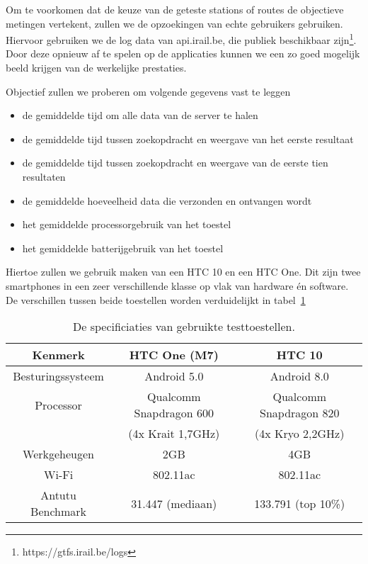Om te voorkomen dat de keuze van de geteste stations of routes de objectieve metingen vertekent, zullen we de opzoekingen van echte gebruikers gebruiken. Hiervoor gebruiken we de log data van api.irail.be, die publiek beschikbaar zijn\footnote{https://gtfs.irail.be/logs}. Door deze  opnieuw af te spelen op de applicaties kunnen we een zo goed mogelijk beeld krijgen van de werkelijke prestaties.

Objectief zullen we proberen om volgende gegevens vast te leggen
\begin{itemize}
	\item de gemiddelde tijd om alle data van de server te halen
	\item de gemiddelde tijd tussen zoekopdracht en weergave van het eerste resultaat
	\item de gemiddelde tijd tussen zoekopdracht en weergave van de eerste tien resultaten
	\item de gemiddelde hoeveelheid data die verzonden en ontvangen wordt
	\item het gemiddelde processorgebruik van het toestel
	\item het gemiddelde batterijgebruik van het toestel
\end{itemize}

Hiertoe zullen we gebruik maken van een HTC 10 en een HTC One. Dit zijn twee smartphones in een zeer verschillende klasse op vlak van hardware én software. De verschillen tussen beide toestellen worden verduidelijkt in tabel~\ref{tab:testdevices}
\begin{table}[ht]
	\begin{tabular}{| c | c | c |}
		\hline
		Kenmerk & HTC One (M7) & HTC 10 \\
		\hline
		Besturingssysteem & Android 5.0 & Android 8.0 \\
		Processor & Qualcomm Snapdragon 600 & Qualcomm Snapdragon 820\\
		& (4x Krait 1,7GHz) & (4x Kryo 2,2GHz) \\
		Werkgeheugen & 2GB & 4GB \\
		Wi-Fi & 802.11ac & 802.11ac \\
		\hline
		Antutu Benchmark & 31.447 (mediaan)  & 133.791 (top 10\%) \\
		\hline
	\end{tabular}
	\caption[Specificaties van de toestellen gebruikt voor testen]{De specificiaties van gebruikte testtoestellen.}
	\label{tab:testdevices}
\end{table}


